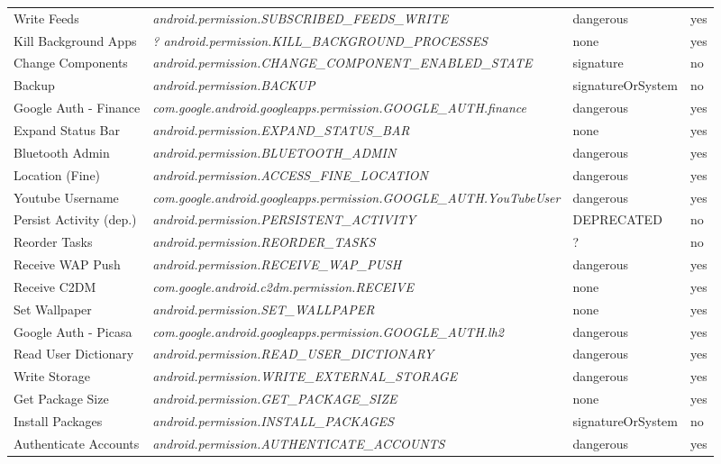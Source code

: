 \begin{small}
\begin{longtable}{p{3cm}|p{8cm}|p{2.5cm}|p{1.5cm}}
Write Feeds & \textit{android.permission.\-SUBSCRIBED\_FEEDS\_WRITE} & dangerous & yes \\
Kill Background Apps & \textit{? android.permission.\-KILL\_BACKGROUND\_PROCESSES} & none & yes \\
Change Components & \textit{android.permission.\-CHANGE\_COMPONENT\_ENABLED\_STATE} & signature & no \\
Backup & \textit{android.permission.\-BACKUP} & signatureOrSystem & no \\
Google Auth - Finance & \textit{com.google.android.googleapps.permission.\-GOOGLE\_AUTH.finance} & dangerous & yes \\
Expand Status Bar & \textit{android.permission.\-EXPAND\_STATUS\_BAR} & none & yes \\
Bluetooth Admin & \textit{android.permission.\-BLUETOOTH\_ADMIN} & dangerous & yes \\
Location (Fine) & \textit{android.permission.\-ACCESS\_FINE\_LOCATION} & dangerous & yes \\
Youtube Username & \textit{com.google.android.googleapps.permission.\-GOOGLE\_AUTH.YouTubeUser} & dangerous & yes \\
Persist Activity (dep.) & \textit{android.permission.\-PERSISTENT\_ACTIVITY} & DEPRECATED & no \\
Reorder Tasks & \textit{android.permission.\-REORDER\_TASKS} & ? & no \\
Receive WAP Push & \textit{android.permission.\-RECEIVE\_WAP\_PUSH} & dangerous & yes \\
Receive C2DM & \textit{com.google.android.c2dm.permission.\-RECEIVE} & none & yes \\
Set Wallpaper & \textit{android.permission.\-SET\_WALLPAPER} & none & yes \\
Google Auth - Picasa & \textit{com.google.android.googleapps.permission.\-GOOGLE\_AUTH.lh2} & dangerous & yes \\
Read User Dictionary & \textit{android.permission.\-READ\_USER\_DICTIONARY} & dangerous & yes \\
Write Storage & \textit{android.permission.\-WRITE\_EXTERNAL\_STORAGE} & dangerous & yes \\
Get Package Size & \textit{android.permission.\-GET\_PACKAGE\_SIZE} & none & yes \\
Install Packages & \textit{android.permission.\-INSTALL\_PACKAGES} & signatureOrSystem & no \\
Authenticate Accounts & \textit{android.permission.\-AUTHENTICATE\_ACCOUNTS} & dangerous & yes \\

\end{longtable}
\end{small}
